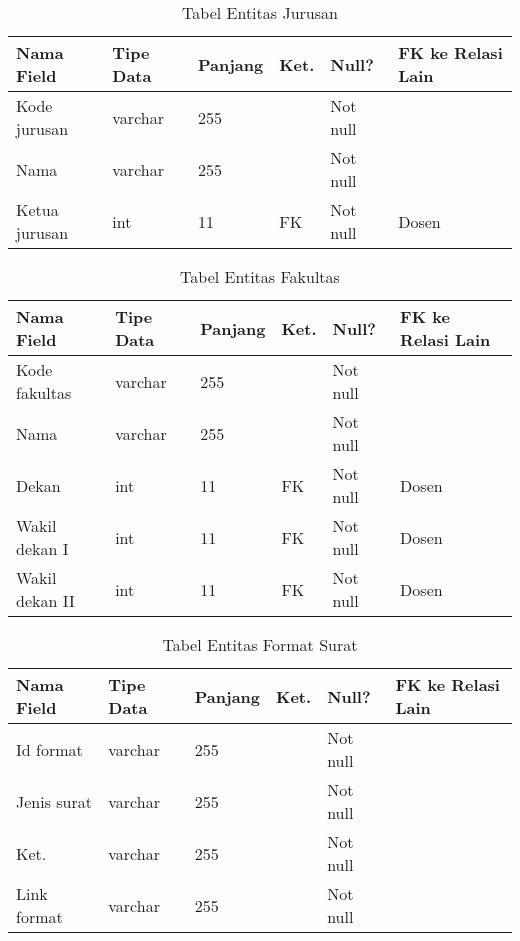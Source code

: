 \begin{table}[H]
\centering
\caption{Tabel Entitas Jurusan}
\label{entitas_jurusan}
\begin{tabular}{|l|l|l|l|l|l|}
\hline
\textbf{Nama Field}&\textbf{Tipe Data}&\textbf{Panjang}&\textbf{Ket.}&\textbf{Null?}&\textbf{FK ke Relasi Lain}\\ \hline
Kode jurusan&varchar&255&&Not null&\\ \hline
Nama&varchar&255&&Not null&\\ \hline
Ketua jurusan&int&11&FK&Not null&Dosen\\ \hline
\end{tabular}
\end{table}

\begin{table}[H]
\centering
\caption{Tabel Entitas Fakultas}
\label{entitas_fakultas}
\begin{tabular}{|l|l|l|l|l|l|}
\hline
\textbf{Nama Field}&\textbf{Tipe Data}&\textbf{Panjang}&\textbf{Ket.}&\textbf{Null?}&\textbf{FK ke Relasi Lain}\\ \hline
Kode fakultas&varchar&255&&Not null&\\ \hline
Nama&varchar&255&&Not null&\\ \hline
Dekan&int&11&FK&Not null&Dosen\\ \hline
Wakil dekan I&int&11&FK&Not null&Dosen\\ \hline
Wakil dekan II&int&11&FK&Not null&Dosen\\ \hline
\end{tabular}
\end{table}

\begin{table}[H]
\centering
\caption{Tabel Entitas Format Surat}
\label{entitas_format_surat}
\begin{tabular}{|l|l|l|l|l|l|}
\hline
\textbf{Nama Field}&\textbf{Tipe Data}&\textbf{Panjang}&\textbf{Ket.}&\textbf{Null?}&\textbf{FK ke Relasi Lain}\\ \hline
Id format&varchar&255&&Not null&\\ \hline
Jenis surat&varchar&255&&Not null&\\ \hline
Ket.&varchar&255&&Not null&\\ \hline
Link format&varchar&255&&Not null&\\ \hline
\end{tabular}
\end{table}


